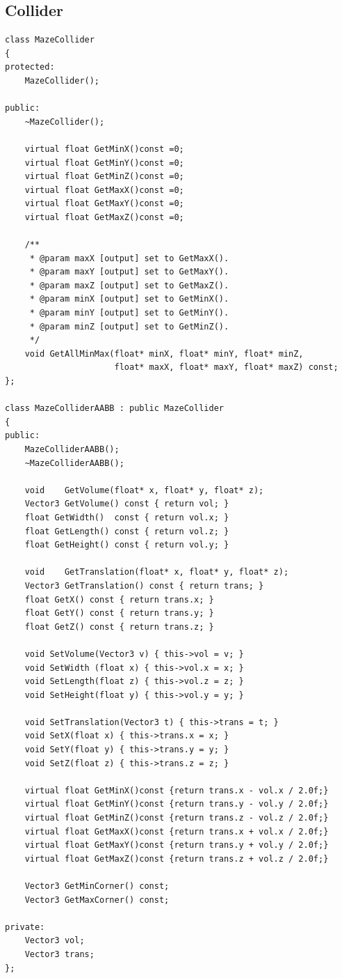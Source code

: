 \subsection{Collider}
\lstCpp
\begin{lstlisting}[caption=The \texttt{MazeCollider} and \texttt{MazeColliderAABB} classes]
class MazeCollider
{
protected:
    MazeCollider();
    
public:
    ~MazeCollider();
    
    virtual float GetMinX()const =0;
    virtual float GetMinY()const =0;
    virtual float GetMinZ()const =0;
    virtual float GetMaxX()const =0;
    virtual float GetMaxY()const =0;
    virtual float GetMaxZ()const =0;
    
    /**
     * @param maxX [output] set to GetMaxX().
     * @param maxY [output] set to GetMaxY().
     * @param maxZ [output] set to GetMaxZ().
     * @param minX [output] set to GetMinX().
     * @param minY [output] set to GetMinY().
     * @param minZ [output] set to GetMinZ().
     */
    void GetAllMinMax(float* minX, float* minY, float* minZ,
                      float* maxX, float* maxY, float* maxZ) const;
};

class MazeColliderAABB : public MazeCollider
{
public:
    MazeColliderAABB();
    ~MazeColliderAABB();
    
    void    GetVolume(float* x, float* y, float* z);
    Vector3 GetVolume() const { return vol; }
    float GetWidth()  const { return vol.x; }
    float GetLength() const { return vol.z; }
    float GetHeight() const { return vol.y; }
    
    void    GetTranslation(float* x, float* y, float* z);
    Vector3 GetTranslation() const { return trans; }
    float GetX() const { return trans.x; }
    float GetY() const { return trans.y; }
    float GetZ() const { return trans.z; }
    
    void SetVolume(Vector3 v) { this->vol = v; }
    void SetWidth (float x) { this->vol.x = x; }
    void SetLength(float z) { this->vol.z = z; }
    void SetHeight(float y) { this->vol.y = y; }
    
    void SetTranslation(Vector3 t) { this->trans = t; }
    void SetX(float x) { this->trans.x = x; }
    void SetY(float y) { this->trans.y = y; }
    void SetZ(float z) { this->trans.z = z; }
    
    virtual float GetMinX()const {return trans.x - vol.x / 2.0f;}
    virtual float GetMinY()const {return trans.y - vol.y / 2.0f;}
    virtual float GetMinZ()const {return trans.z - vol.z / 2.0f;}
    virtual float GetMaxX()const {return trans.x + vol.x / 2.0f;}
    virtual float GetMaxY()const {return trans.y + vol.y / 2.0f;}
    virtual float GetMaxZ()const {return trans.z + vol.z / 2.0f;}
    
    Vector3 GetMinCorner() const;
    Vector3 GetMaxCorner() const;
    
private:
    Vector3 vol;
    Vector3 trans;
};
\end{lstlisting}


